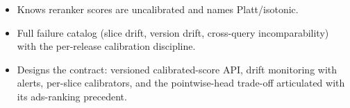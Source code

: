 \begin{interviewq}

\goodgreat
\begin{itemize}
    \item {} Knows reranker scores are uncalibrated and names Platt/isotonic.
    \item {} Full failure catalog (slice drift, version drift, cross-query incomparability) with the per-release calibration discipline.
    \item {} Designs the contract: versioned calibrated-score API, drift monitoring with alerts, per-slice calibrators, and the pointwise-head trade-off articulated with its ads-ranking precedent.
\end{itemize}

\end{interviewq}
